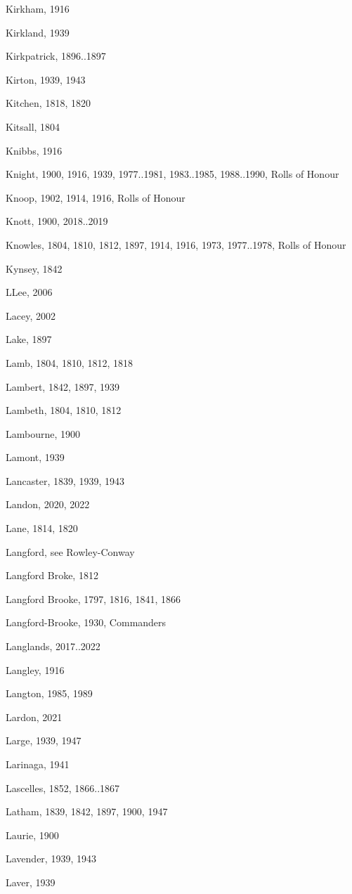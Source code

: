 {\begin{theindex}
\item Kirkham, 1916
\item Kirkland, 1939
\item Kirkpatrick, 1896..1897
\item Kirton, 1939, 1943
\item Kitchen, 1818, 1820
\item Kitsall, 1804
\item Knibbs, 1916
\item Knight, 1900, 1916, 1939, 1977..1981, 1983..1985, 1988..1990, Rolls of Honour
\item Knoop, 1902, 1914, 1916, Rolls of Honour
\item Knott, 1900, 2018..2019
\item Knowles, 1804, 1810, 1812, 1897, 1914, 1916, 1973, 1977..1978, Rolls of Honour
\item Kynsey, 1842
\item LLee, 2006
\item Lacey, 2002
\item Lake, 1897
\item Lamb, 1804, 1810, 1812, 1818
\item Lambert, 1842, 1897, 1939
\item Lambeth, 1804, 1810, 1812
\item Lambourne, 1900
\item Lamont, 1939
\item Lancaster, 1839, 1939, 1943
\item Landon, 2020, 2022
\item Lane, 1814, 1820
\item Langford, see Rowley-Conway
\item Langford Broke, 1812
\item Langford Brooke, 1797, 1816, 1841, 1866
\item Langford-Brooke, 1930, Commanders
\item Langlands, 2017..2022
\item Langley, 1916
\item Langton, 1985, 1989
\item Lardon, 2021
\item Large, 1939, 1947
\item Larinaga, 1941
\item Lascelles, 1852, 1866..1867
\item Latham, 1839, 1842, 1897, 1900, 1947
\item Laurie, 1900
\item Lavender, 1939, 1943
\item Laver, 1939

\end{theindex}}
